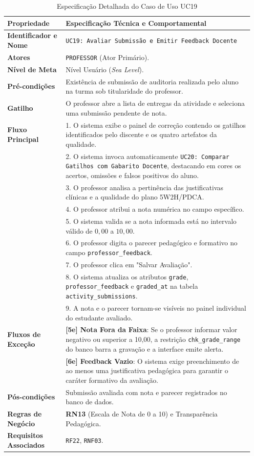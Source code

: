 \begin{table}[!ht]
\centering
\caption{Especificação Detalhada do Caso de Uso UC19}
\label{tab_uc19}
\footnotesize
\begin{tabularx}{\textwidth}{p{3.5cm} X}
\toprule
\textbf{Propriedade} & \textbf{Especificação Técnica e Comportamental} \\
\midrule
\textbf{Identificador e Nome} & \texttt{UC19: Avaliar Submissão e Emitir Feedback Docente} \\
\textbf{Atores} & \texttt{PROFESSOR} (Ator Primário). \\
\textbf{Nível de Meta} & Nível Usuário (\textit{Sea Level}). \\
\textbf{Pré-condições} & Existência de submissão de auditoria realizada pelo aluno na turma sob titularidade do professor. \\
\textbf{Gatilho} & O professor abre a lista de entregas da atividade e seleciona uma submissão pendente de nota. \\
\textbf{Fluxo Principal} & 
1. O sistema exibe o painel de correção contendo os gatilhos identificados pelo discente e os quatro artefatos da qualidade.\\
& 2. O sistema invoca automaticamente \texttt{UC20: Comparar Gatilhos com Gabarito Docente}, destacando em cores os acertos, omissões e falsos positivos do aluno.\\
& 3. O professor analisa a pertinência das justificativas clínicas e a qualidade do plano 5W2H/PDCA.\\
& 4. O professor atribui a nota numérica no campo específico.\\
& 5. O sistema valida se a nota informada está no intervalo válido de $0{,}00$ a $10{,}00$.\\
& 6. O professor digita o parecer pedagógico e formativo no campo \texttt{professor\_feedback}.\\
& 7. O professor clica em "Salvar Avaliação".\\
& 8. O sistema atualiza os atributos \texttt{grade}, \texttt{professor\_feedback} e \texttt{graded\_at} na tabela \texttt{activity\_submissions}.\\
& 9. A nota e o parecer tornam-se visíveis no painel individual do estudante avaliado. \\
\textbf{Fluxos de Exceção} & 
\textbf{[5e] Nota Fora da Faixa}: Se o professor informar valor negativo ou superior a 10,00, a restrição \texttt{chk\_grade\_range} do banco barra a gravação e a interface emite alerta.\\
& \textbf{[6e] Feedback Vazio}: O sistema exige preenchimento de ao menos uma justificativa pedagógica para garantir o caráter formativo da avaliação. \\
\textbf{Pós-condições} & Submissão avaliada com nota e parecer registrados no banco de dados. \\
\textbf{Regras de Negócio} & \textbf{RN13} (Escala de Nota de 0 a 10) e Transparência Pedagógica. \\
\textbf{Requisitos Associados} & \texttt{RF22}, \texttt{RNF03}. \\
\bottomrule
\end{tabularx}
\end{table}

